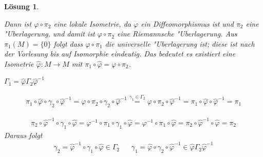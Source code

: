 \documentclass[paper=A4, twoside, chapterprefix=true, bibliography=totoc, headsepline]{scrbook}
\let\temp\phi{}
\let\phi\varphi{}
\let\varphi\temp{}
\let\temp\theta{}
\let\theta\vartheta{}
\let\vartheta\temp{}
\let\temp\epsilon{}
\let\epsilon\varepsilon{}
\let\varepsilon\temp{}
\let\temp\rho{}
\let\rho\varrho{}
\let\varrho\temp{}
\theoremstyle{plain}
\theoremstyle{nonumberplain}
\theoremstyle{empty}
\theoremstyle{break}
\newtheorem{Loes}{L\"osung}
\newcommand{\quot}[1]{\textrm{\glqq}{#1}\textrm{\grqq}}
\begin{document}
\begin{Loes}
\begin{description}[leftmargin=*]
{}
	Dann ist $\phi \circ \pi_2$ eine lokale Isometrie, da $\phi$ ein Diffeomorphismus ist und $\pi_2$ eine "Uberlagerung, und damit ist $\phi \circ \pi_2$ eine Riemannsche "Uberlagerung.
	Aus $\pi_1(M) = \{0\}$ folgt dass $\phi \circ \pi_1$ die universelle "Uberlagerung ist; diese ist nach der Vorlesung bis auf Isomorphie eindeutig.
	Das bedeutet es existiert eine Isometrie $\hat\phi: M \to M$ mit $\pi_1 \circ \hat\phi = \phi \circ \pi_2$.
	\begin{description}[leftmargin=*,font=\normalfont\itshape]
	\item[Behauptung:] $\Gamma_1 = \hat\phi \Gamma_2 \hat\phi^{-1}$
	\item[Beweis:] \begin{description}[leftmargin=*,font=\normalfont]
		\item[\quot{$\subseteq$}:]
			\begin{align*}
				\pi_1 \circ \hat\phi \circ \gamma_2 \circ \hat\phi^{-1} = \phi \circ \pi_2 \circ \gamma_2 \circ \hat\phi^{-1} \overset{\gamma_1 \in \Gamma_2}{=} \phi \circ \pi_2 \circ \hat\phi^{-1} = \pi_1 \circ \hat\phi \circ \hat\phi^{-1} = \pi_1
			\end{align*}
		\item[\quot{$\supseteq$}:]
			\begin{align*}
				\pi_2 \circ \hat\phi^{-1} \circ \gamma_1 \circ \hat\phi = \phi^{-1} \circ \pi_1 \circ \gamma_1 \circ \hat\phi = \phi^{-1} \circ \pi_1 \circ \hat\phi = \pi_2 \circ \hat\phi^{-1} \circ \hat\phi = \pi_2
			\end{align*}
			Daraus folgt
			\begin{align*}
				\gamma_2 = \hat\phi^{-1} \circ \gamma_1 \circ \hat\phi \in \Gamma_2 && \gamma_1 = \hat\phi \circ \gamma_2 \circ \hat\phi^{-1} \in \hat\phi \Gamma_2 \hat\phi^{-1}
			\end{align*}
		\end{description}
	\end{description}
\end{description}\end{Loes}

\printindex

\printglossary[title=Glossar] %



\end{document}
